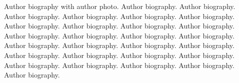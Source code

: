 \documentclass[a4paper,fleqn]{cas-dc}
\begin{document}
%





Author biography with author photo.
Author biography. Author biography. Author biography.
Author biography. Author biography. Author biography.
Author biography. Author biography. Author biography.
Author biography. Author biography. Author biography.
Author biography. Author biography. Author biography.
Author biography. Author biography. Author biography.
Author biography. Author biography. Author biography.
Author biography. Author biography. Author biography.
Author biography. Author biography. Author biography.
\endbio
\end{document}
